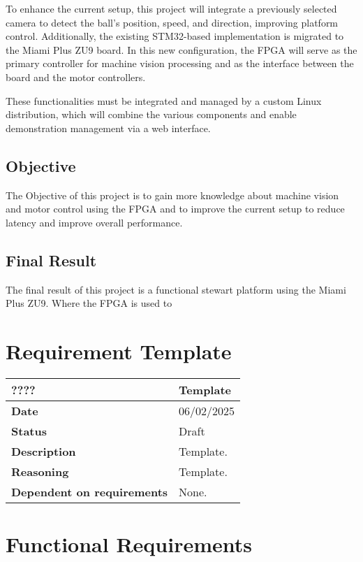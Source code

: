 \documentclass{article}
\begin{document}
To enhance the current setup, this project will
integrate a previously selected camera to detect the ball's position, speed, and
direction, improving platform control. Additionally, the existing STM32-based
implementation is migrated to the Miami Plus ZU9 board. In this new
configuration, the FPGA will serve as the primary controller for machine vision
processing and as the interface between the board and the motor controllers.

These functionalities must be integrated and managed by a custom
Linux distribution, which will combine the various components and enable
demonstration management via a web interface.

\subsection{Objective}
The Objective of this project is to gain more knowledge about machine vision and motor control using the FPGA 
and to improve the current setup to reduce latency and improve overall performance.
\subsection{Final Result}
The final result of this project is a functional stewart platform using the Miami Plus ZU9.
Where the FPGA is used to 
\newpage

\section{Requirement Template}
\begin{table}[H]
    \renewcommand{\arraystretch}{1.3}
    \begin{tabular}{|l|p{10cm}|}
        \hline
        \rowcolor{gray!50}
        \textbf{????} & \textbf{Template} \\ \hline
        \textbf{Date} & 06/02/2025 \\ \hline
        \textbf{Status} & Draft \\ \hline
        \textbf{Description} & Template. \\ \hline
        \textbf{Reasoning} & Template. \\ \hline
        \textbf{Dependent on requirements} & None. \\ \hline
    \end{tabular}
\end{table}

\section{Functional Requirements}
\end{document}
